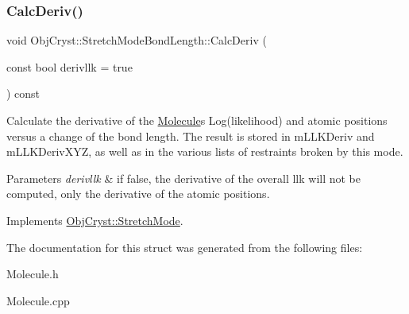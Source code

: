 \subsubsection{\texorpdfstring{CalcDeriv()}{CalcDeriv()}}
{\footnotesize\ttfamily void Obj\+Cryst\+::\+Stretch\+Mode\+Bond\+Length\+::\+Calc\+Deriv (\begin{DoxyParamCaption}\item[{const bool}]{derivllk = {\ttfamily true} }\end{DoxyParamCaption}) const\hspace{0.3cm}{\ttfamily [virtual]}}

Calculate the derivative of the \mbox{\hyperlink{class_obj_cryst_1_1_molecule}{Molecule}}\textquotesingle{}s Log(likelihood) and atomic positions versus a change of the bond length. The result is stored in m\+L\+L\+K\+Deriv and m\+L\+L\+K\+Deriv\+X\+YZ, as well as in the various lists of restraints broken by this mode.


\begin{DoxyParams}{Parameters}
{\em derivllk} & if false, the derivative of the overall llk will not be computed, only the derivative of the atomic positions. \\
\hline
\end{DoxyParams}


Implements \mbox{\hyperlink{struct_obj_cryst_1_1_stretch_mode_a5b5ab5f9819c047a49719a330722d419}{Obj\+Cryst\+::\+Stretch\+Mode}}.



The documentation for this struct was generated from the following files\+:\begin{DoxyCompactItemize}
\item 
Molecule.\+h\item 
Molecule.\+cpp\end{DoxyCompactItemize}
